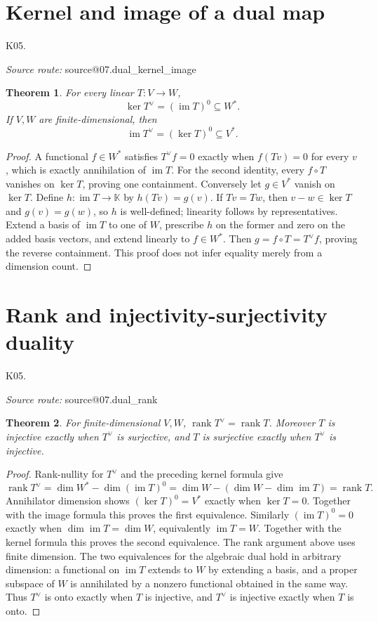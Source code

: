 \documentclass[11pt,a4paper]{book}
\makeatletter
\newtheorem{theorem}{Theorem}[chapter]
\theoremstyle{definition}\newtheorem{definition}[theorem]{Definition}
\theoremstyle{remark}\newtheorem{remark}[theorem]{Remark}
\newcommand{\K}{\mathbb K}\newcommand{\R}{\mathbb R}\newcommand{\C}{\mathbb C}
\DeclareMathOperator{\im}{im}\DeclareMathOperator{\rank}{rank}
\newcommand{\Kentry}[2]{\section{#2}\label{k:#1}\noindent\textsf{\small K05.\detokenize{#1}}\par
  \begingroup\small\color{black!65}\textit{Source route: }\csname source@#1\endcsname\par\endgroup}
\makeatother
\begin{document}
\Kentry{07.dual_kernel_image}{Kernel and image of a dual map}
\begin{theorem}
For every linear $T:V\to W$,
\[\ker T^\vee=(\im T)^0\subseteq W^*.
\]
If $V,W$ are finite-dimensional, then
\[\im T^\vee=(\ker T)^0\subseteq V^*.
\]
\end{theorem}
\begin{proof}
A functional $f\in W^*$ satisfies $T^\vee f=0$ exactly when $f(Tv)=0$ for every $v$, which is exactly annihilation of $\im T$. For the second identity, every $f\circ T$ vanishes on $\ker T$, proving one containment. Conversely let $g\in V^*$ vanish on $\ker T$. Define $h:\im T\to\K$ by $h(Tv)=g(v)$. If $Tv=Tw$, then $v-w\in\ker T$ and $g(v)=g(w)$, so $h$ is well-defined; linearity follows by representatives. Extend a basis of $\im T$ to one of $W$, prescribe $h$ on the former and zero on the added basis vectors, and extend linearly to $f\in W^*$. Then $g=f\circ T=T^\vee f$, proving the reverse containment. This proof does not infer equality merely from a dimension count.
\end{proof}

\Kentry{07.dual_rank}{Rank and injectivity-surjectivity duality}
\begin{theorem}
For finite-dimensional $V,W$, $\rank T^\vee=\rank T$. Moreover $T$ is injective exactly when $T^\vee$ is surjective, and $T$ is surjective exactly when $T^\vee$ is injective.
\end{theorem}
\begin{proof}
Rank-nullity for $T^\vee$ and the preceding kernel formula give
\[\rank T^\vee=\dim W^*-\dim(\im T)^0
 =\dim W-(\dim W-\dim\im T)=\rank T.\]
Annihilator dimension shows $(\ker T)^0=V^*$ exactly when $\ker T=0$. Together with the image formula this proves the first equivalence. Similarly $(\im T)^0=0$ exactly when $\dim\im T=\dim W$, equivalently $\im T=W$. Together with the kernel formula this proves the second equivalence. The rank argument above uses finite dimension. The two equivalences for the algebraic dual hold in arbitrary dimension: a functional on $\im T$ extends to $W$ by extending a basis, and a proper subspace of $W$ is annihilated by a nonzero functional obtained in the same way. Thus $T^\vee$ is onto exactly when $T$ is injective, and $T^\vee$ is injective exactly when $T$ is onto.
\end{proof}
\end{document}
